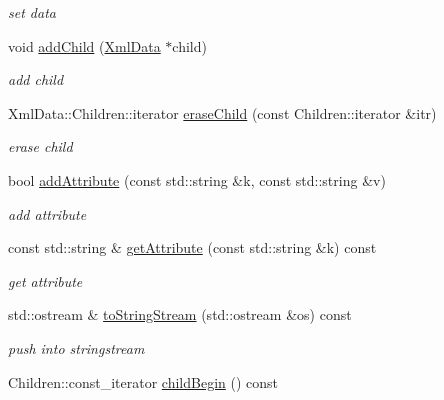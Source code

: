\begin{DoxyCompactItemize}
\begin{DoxyCompactList}\small\item\em set data \end{DoxyCompactList}\item 
\hypertarget{classsinsy_1_1XmlData_a41c44b99462fb6cdc8dfae815c2c0ea2}{void \hyperlink{classsinsy_1_1XmlData_a41c44b99462fb6cdc8dfae815c2c0ea2}{add\-Child} (\hyperlink{classsinsy_1_1XmlData}{\-Xml\-Data} $\ast$child)}\label{classsinsy_1_1XmlData_a41c44b99462fb6cdc8dfae815c2c0ea2}

\begin{DoxyCompactList}\small\item\em add child \end{DoxyCompactList}\item 
\hypertarget{classsinsy_1_1XmlData_a857e8a855483e2465d46d86d7d360ef0}{\-Xml\-Data\-::\-Children\-::iterator \hyperlink{classsinsy_1_1XmlData_a857e8a855483e2465d46d86d7d360ef0}{erase\-Child} (const \-Children\-::iterator \&itr)}\label{classsinsy_1_1XmlData_a857e8a855483e2465d46d86d7d360ef0}

\begin{DoxyCompactList}\small\item\em erase child \end{DoxyCompactList}\item 
\hypertarget{classsinsy_1_1XmlData_ab42614836cefbe72aa7d5b69fa4e1412}{bool \hyperlink{classsinsy_1_1XmlData_ab42614836cefbe72aa7d5b69fa4e1412}{add\-Attribute} (const std\-::string \&k, const std\-::string \&v)}\label{classsinsy_1_1XmlData_ab42614836cefbe72aa7d5b69fa4e1412}

\begin{DoxyCompactList}\small\item\em add attribute \end{DoxyCompactList}\item 
\hypertarget{classsinsy_1_1XmlData_af935830732afe0dbb556673cc392c35b}{const std\-::string \& \hyperlink{classsinsy_1_1XmlData_af935830732afe0dbb556673cc392c35b}{get\-Attribute} (const std\-::string \&k) const }\label{classsinsy_1_1XmlData_af935830732afe0dbb556673cc392c35b}

\begin{DoxyCompactList}\small\item\em get attribute \end{DoxyCompactList}\item 
std\-::ostream \& \hyperlink{classsinsy_1_1XmlData_a7b725f824cf3b8dc6509f09303cdb07d}{to\-String\-Stream} (std\-::ostream \&os) const 
\begin{DoxyCompactList}\small\item\em push into stringstream \end{DoxyCompactList}\item 
\hypertarget{classsinsy_1_1XmlData_aabe43178ad0c9e454f51902bcc48b652}{\-Children\-::const\-\_\-iterator \hyperlink{classsinsy_1_1XmlData_aabe43178ad0c9e454f51902bcc48b652}{child\-Begin} () const }\label{classsinsy_1_1XmlData_aabe43178ad0c9e454f51902bcc48b652}


\end{DoxyCompactItemize}

